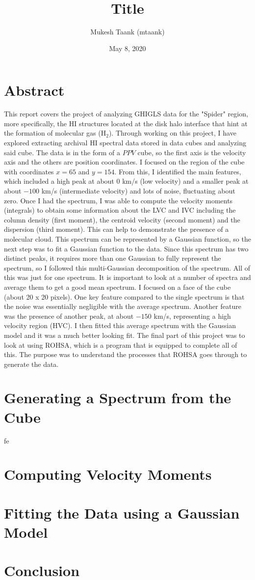\documentclass[12pt]{report}
\title{Title}
\author{Mukesh Taank (mtaank)}
\date{May 8, 2020}
\begin{document}
\maketitle

\section*{Abstract}
This report covers the project of analyzing GHIGLS data for the "Spider" region, more specifically, the HI structures located at the disk halo interface that hint at the formation of molecular gas (H$_{2}$). Through working on this project, I have explored extracting  archival HI spectral data stored in data cubes and analyzing said cube. The data is in the form of a $PPV$ cube, so the first axis is the velocity axis and the others are position coordinates. I focused on the region of the cube with coordinates $x = 65$ and $y = 154$. From this, I identified the main features, which included a high peak at about $0$ km/s (low velocity) and a smaller peak at about $-100$ km/s (intermediate velocity) and lots of noise, fluctuating about zero. Once I had the spectrum, I was able to compute the velocity moments (integrals) to obtain some information about the LVC and IVC including the column density (first moment), the centroid velocity (second moment) and the dispersion (third moment). This can help to demonstrate the presence of a molecular cloud. This spectrum can be represented by a Gaussian function, so the next step was to fit a Gaussian function to the data. Since this spectrum has two distinct peaks, it requires more than one Gaussian to fully represent the spectrum, so I followed this multi-Gaussian decomposition of the spectrum. All of this was just for one spectrum. It is important to look at a number of spectra and average them to get a good mean spectrum. I focused on a face of the cube (about 20 x 20 pixels). One key feature compared to the single spectrum is that the noise was essentially negligible with the average spectrum. Another feature was the presence of another peak, at about $-150$ km/s, representing a high velocity region (HVC). I then fitted this average spectrum with the Gaussian model and it was a much better looking fit. The final part of this project was to look at using ROHSA, which is a program that is equipped to complete all of this. The purpose was to understand the processes that ROHSA goes through to generate the data.
\newpage

\section*{Generating a Spectrum from the Cube}
fe
\section*{Computing Velocity Moments}
\section*{Fitting the Data using a Gaussian Model}
\section*{Conclusion}
\end{document}

